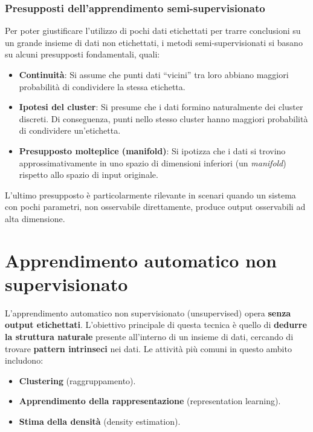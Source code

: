\subsubsection{Presupposti dell'apprendimento semi-supervisionato}

Per poter giustificare l'utilizzo di pochi dati etichettati per trarre
conclusioni su un grande insieme di dati non etichettati, i metodi
semi-supervisionati si basano su alcuni presupposti fondamentali, quali:
\begin{itemize}
    \item \textbf{Continuità}: Si assume che punti dati ``vicini'' tra
    loro abbiano maggiori probabilità di condividere la stessa
    etichetta.
    \item \textbf{Ipotesi del cluster}: Si presume che i dati formino
    naturalmente dei cluster discreti. Di conseguenza,
    punti nello stesso cluster hanno maggiori probabilità di
    condividere un'etichetta.
    \item \textbf{Presupposto molteplice (manifold)}: Si ipotizza che
    i dati si trovino approssimativamente in uno spazio di
    dimensioni inferiori (un \textit{manifold}) rispetto allo
    spazio di input originale.
\end{itemize}

L'ultimo presupposto è particolarmente rilevante in scenari
quando un sistema con pochi parametri, non osservabile
direttamente, produce output osservabili ad alta
dimensione.

\section{Apprendimento automatico non supervisionato}

L'apprendimento automatico non supervisionato (unsupervised)
opera \textbf{senza output etichettati}. L'obiettivo principale
di questa tecnica è quello di \textbf{dedurre la
struttura naturale} presente all'interno di un insieme di dati,
cercando di trovare \textbf{pattern intrinseci}
nei dati. Le attività più comuni in questo ambito includono:
\begin{itemize}
    \item \textbf{Clustering} (raggruppamento).
    \item \textbf{Apprendimento della rappresentazione}
    (representation learning).
    \item \textbf{Stima della densità} (density estimation).
\end{itemize}


